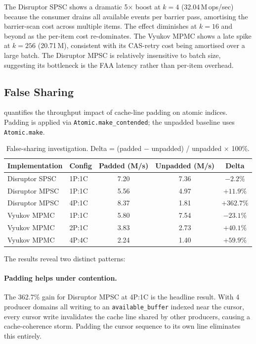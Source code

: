 \documentclass[11pt,a4paper]{article}
\begin{document}
The Disruptor SPSC shows a dramatic 5$\times$ boost at $k=4$ (32.04\,M\,ops/sec)
because the consumer drains all available events per barrier pass, amortising the
barrier-scan cost across multiple items. The effect diminishes at $k=16$ and beyond
as the per-item cost re-dominates. The Vyukov MPMC shows a late spike at $k=256$
(20.71\,M), consistent with its CAS-retry cost being amortised over a large batch.
The Disruptor MPSC is relatively insensitive to batch size, suggesting its bottleneck
is the FAA latency rather than per-item overhead.

\subsection{False Sharing }
\label{subsec:false-sharing}

 quantifies the throughput impact of cache-line padding
on atomic indices. Padding is applied via \texttt{Atomic.make\_contended}; the
unpadded baseline uses \texttt{Atomic.make}.

\begin{table}[H]
\centering
\caption{False-sharing investigation. Delta = (padded $-$ unpadded) / unpadded $\times$ 100\%.}
\label{tab:false-sharing}
\begin{tabular}{@{}llccc@{}}
\toprule
Implementation & Config & Padded (M/s) & Unpadded (M/s) & Delta \\
\midrule
Disruptor SPSC & 1P:1C  & 7.20 & 7.36 & $-2.2\%$   \\
Disruptor MPSC & 1P:1C  & 5.56 & 4.97 & $+11.9\%$  \\
Disruptor MPSC & 4P:1C  & 8.37 & 1.81 & $+362.7\%$ \\
Vyukov MPMC    & 1P:1C  & 5.80 & 7.54 & $-23.1\%$  \\
Vyukov MPMC    & 2P:1C  & 3.83 & 2.73 & $+40.1\%$  \\
Vyukov MPMC    & 4P:4C  & 2.24 & 1.40 & $+59.9\%$  \\
\bottomrule
\end{tabular}
\end{table}

The results reveal two distinct patterns:

\paragraph{Padding helps under contention.} The 362.7\% gain for Disruptor MPSC at 4P:1C
is the headline result. With 4 producer domains all writing to an \texttt{available\_buffer}
indexed near the cursor, every cursor write invalidates the cache line shared by
other producers, causing a cache-coherence storm. Padding the cursor sequence to its own
line eliminates this entirely.
\end{document}
